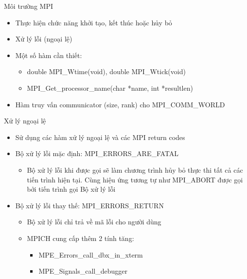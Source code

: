 \documentclass[10pt]{beamer}
\theoremstyle{remark}
\numberwithin{algocf}{section}
\numberwithin{equation}{section}
\numberwithin{dl}{section}
\numberwithin{figure}{section}
\begin{document}
\begin{frame}{Môi trường MPI}
    \begin{itemize}
        \item Thực hiện chức năng khởi tạo, kết thúc hoặc hủy bỏ
        \item Xử lý lỗi (ngoại lệ)
        \item Một số hàm cần thiết:
        \begin{itemize}
            \item double MPI\_Wtime(void), double MPI\_Wtick(void)
            \item MPI\_Get\_processor\_name(char *name, int *resultlen)
        \end{itemize}
        \item Hàm truy vấn communicator (size, rank) cho MPI\_COMM\_WORLD
    \end{itemize}

\end{frame}

\begin{frame}{Xử lý ngoại lệ}
    \begin{itemize}
        \item Sử dụng các hàm xử lý ngoại lệ và các MPI return codes
        \item Bộ xử lý lỗi mặc định: MPI\_ERRORS\_ARE\_FATAL
        \begin{itemize}
            \item Bộ xử lý lỗi khi được gọi sẽ làm chương trình hủy bỏ thực thi tất cả các tiến trình hiện tại.
            Cùng hiệu ứng tương tự như MPI\_ABORT được gọi bởi tiến trình gọi Bộ xử lý lỗi
        \end{itemize}
        \item Bộ xử lý lỗi thay thế: MPI\_ERRORS\_RETURN
        \begin{itemize}
            \item Bộ xử lý lỗi chỉ trả về mã lỗi cho người dùng
            \item MPICH cung cấp thêm 2 tính tăng:
            \begin{itemize}
                \item MPE\_Errors\_call\_dbx\_in\_xterm
                \item MPE\_Signals\_call\_debugger 
            \end{itemize}
        \end{itemize}
    \end{itemize}
\end{frame}
\end{document}
